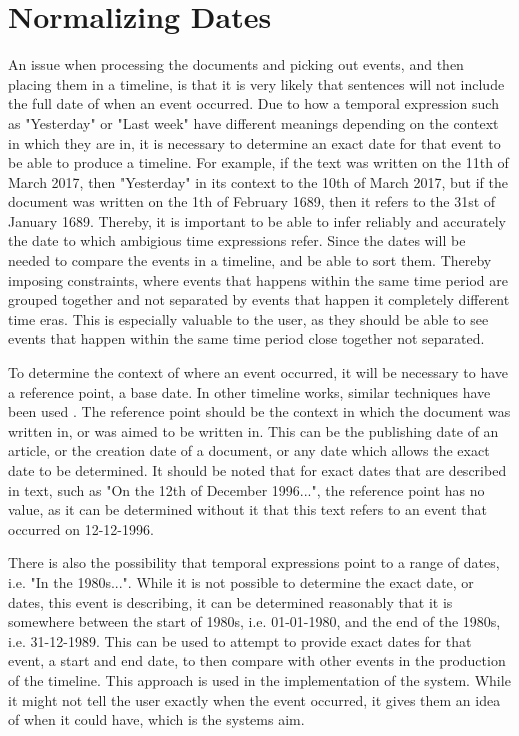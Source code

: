 \section{Normalizing Dates}
\par An issue when processing the documents and picking out events, and then placing them in a timeline, is that it is very likely that sentences will not include the full date of when an event occurred. Due to how a temporal expression such as "Yesterday" or "Last week" have different meanings depending on the context in which they are in, it is necessary to determine an exact date for that event to be able to produce a timeline. For example, if the text was written on the 11th of March 2017, then "Yesterday" in its context to the 10th of March 2017, but if the document was written on the 1th of February 1689, then it refers to the 31st of January 1689. Thereby, it is important to be able to infer reliably and accurately the date to which ambigious time expressions refer. Since the dates will be needed to compare the events in a timeline, and be able to sort them. Thereby imposing constraints, where events that happens within the same time period are grouped together and not separated by events that happen it completely different time eras. This is especially valuable to the user, as they should be able to see events that happen within the same time period close together not separated.
\par To determine the context of where an event occurred, it will be necessary to have a reference point, a base date. In other timeline works, similar techniques have been used \cite{mccloskymanning2012}. The reference point should be the context in which the document was written in, or was aimed to be written in. This can be the publishing date of an article, or the creation date of a document, or any date which allows the exact date to be determined. It should be noted that for exact dates that are described in text, such as "On the 12th of December 1996...", the reference point has no value, as it can be determined without it that this text refers to an event that occurred on 12-12-1996.
\par There is also the possibility that temporal expressions point to a range of dates, i.e. "In the 1980s...". While it is not possible to determine the exact date, or dates, this event is describing, it can be determined reasonably \cite{mccloskymanning2012} that it is somewhere between the start of 1980s, i.e. 01-01-1980, and the end of the 1980s, i.e. 31-12-1989. This can be used to attempt to provide exact dates for that event, a start and end date, to then compare with other events in the production of the timeline. This approach is used in the implementation of the system. While it might not tell the user exactly when the event occurred, it gives them an idea of when it could have, which is the systems aim.


